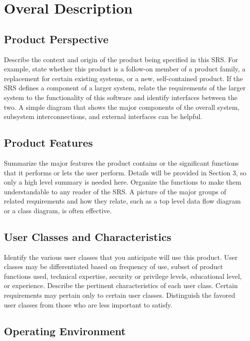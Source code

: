 
\chapter{Overal Description}

\section{Product Perspective}

Describe the context and origin of the product being specified in this
SRS. For example, state whether this product is a follow-on member of
a product family, a replacement for certain existing systems, or a
new, self-contained product. If the SRS defines a component of a
larger system, relate the requirements of the larger system to the
functionality of this software and identify interfaces between the
two. A simple diagram that shows the major components of the overall
system, subsystem interconnections, and external interfaces can be
helpful.

\section{Product Features}

Summarize the major features the product contains or the significant
functions that it performs or lets the user perform. Details will be
provided in Section 3, so only a high level summary  is needed
here. Organize the functions to make them understandable to any reader
of the SRS. A picture of the major groups of related requirements and
how they relate, such as a top level data flow diagram or a class
diagram, is often effective.

\section{User Classes and Characteristics}

Identify the various user classes that you anticipate will use this
product. User classes may be differentiated based on frequency of use,
subset of product functions used, technical expertise, security or
privilege levels, educational level, or experience. Describe the
pertinent characteristics of each user class. Certain requirements may
pertain only to certain user classes. Distinguish the favored user
classes from those who are less important to satisfy.

\section{Operating Environment}

